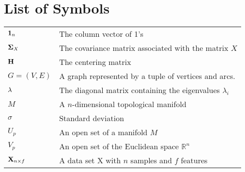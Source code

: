 \chapter*{List of Symbols}

\begin{table}[htbp]
	\begin{tabularx}{\textwidth}{XX}
		$\mathbf{1}_n$                       & The column vector of 1's \bigstrut\\
		$\mathbf{\Sigma}_X$ 		  & The covariance matrix associated with the matrix $X$ \bigstrut\\
		$\mathbf{H}$ 						     & The centering matrix \bigstrut \\
		$G=(V, E)$                           & A graph represented by a tuple of vertices and arcs. \\
		$\mathbf{\lambda}$ 		    & The diagonal matrix containing the eigenvalues $\lambda_i$ \bigstrut\\
		$M$ 						               & A $n$-dimensional topological manifold \bigstrut\\
		$\sigma$ 				             & Standard deviation \bigstrut\\
		$U_p$ 						             & An open set of a manifold $M$ \bigstrut\\
		$V_p$ 						             & An open set of the Euclidean space $\mathbb{R}^n$ \bigstrut\\
		$\mathbf{X}_{n \times f}$  & A data set X with $n$ samples and $f$ features \bigstrut\\
	\end{tabularx}
\end{table}
